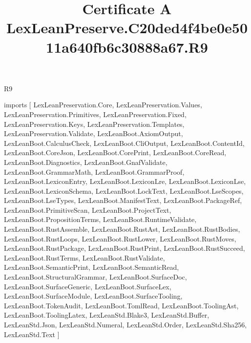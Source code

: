\begin{lexlean}{R9}
\title{Certificate A LexLeanPreserve.C20ded4f4be0e5011a640fb6c30888a67.R9}
\begin{coremodule}
imports [
  LexLeanPreservation.Core,
  LexLeanPreservation.Values,
  LexLeanPreservation.Primitives,
  LexLeanPreservation.Fixed,
  LexLeanPreservation.Keys,
  LexLeanPreservation.Templates,
  LexLeanPreservation.Validate,
  LexLeanBoot.AxiomOutput,
  LexLeanBoot.CalculusCheck,
  LexLeanBoot.CliOutput,
  LexLeanBoot.ContentId,
  LexLeanBoot.CoreJson,
  LexLeanBoot.CorePrint,
  LexLeanBoot.CoreRead,
  LexLeanBoot.Diagnostics,
  LexLeanBoot.GnafValidate,
  LexLeanBoot.GrammarMath,
  LexLeanBoot.GrammarProof,
  LexLeanBoot.LexiconEntry,
  LexLeanBoot.LexiconLre,
  LexLeanBoot.LexiconLse,
  LexLeanBoot.LexiconSchema,
  LexLeanBoot.LockText,
  LexLeanBoot.LseScopes,
  LexLeanBoot.LseTypes,
  LexLeanBoot.ManifestText,
  LexLeanBoot.PackageRef,
  LexLeanBoot.PrimitiveScan,
  LexLeanBoot.ProjectText,
  LexLeanBoot.PropositionTerms,
  LexLeanBoot.RuntimeValidate,
  LexLeanBoot.RustAssemble,
  LexLeanBoot.RustAst,
  LexLeanBoot.RustBodies,
  LexLeanBoot.RustLoops,
  LexLeanBoot.RustLower,
  LexLeanBoot.RustMoves,
  LexLeanBoot.RustPackage,
  LexLeanBoot.RustPrint,
  LexLeanBoot.RustSucceed,
  LexLeanBoot.RustTerms,
  LexLeanBoot.RustValidate,
  LexLeanBoot.SemanticPrint,
  LexLeanBoot.SemanticRead,
  LexLeanBoot.StructuralGrammar,
  LexLeanBoot.SurfaceDoc,
  LexLeanBoot.SurfaceGeneric,
  LexLeanBoot.SurfaceLex,
  LexLeanBoot.SurfaceModule,
  LexLeanBoot.SurfaceTooling,
  LexLeanBoot.TokenAudit,
  LexLeanBoot.TomlRead,
  LexLeanBoot.ToolingAst,
  LexLeanBoot.ToolingLatex,
  LexLeanStd.Blake3,
  LexLeanStd.Buffer,
  LexLeanStd.Json,
  LexLeanStd.Numeral,
  LexLeanStd.Order,
  LexLeanStd.Sha256,
  LexLeanStd.Text
]


\end{coremodule}
\end{lexlean}

